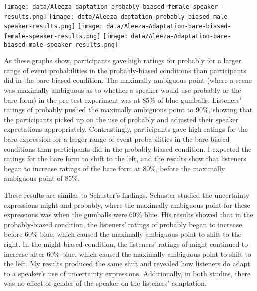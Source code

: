 \documentclass[lucida,biblatex]{sp} %
\begin{document}
\begin{center}
\texttt{[image: data/Aleeza-daptation-probably-biased-female-speaker-results.png]}
\texttt{[image: data/Aleeza-daptation-probably-biased-male-speaker-results.png]}
\texttt{[image: data/Aleeza-Adaptation-bare-biased-female-speaker-results.png]}
\texttt{[image: data/Aleeza-Adaptation-bare-biased-male-speaker-results.png]}
\vspace{2em}
\end{center}
As these graphs show, participants gave high ratings for probably for a larger range of event probabilities in the probably-biased conditions than participants did in the bare-biased condition. The maximally ambiguous point (where a scene was maximally ambiguous as to whether a speaker would use probably or the bare form) in the pre-test experiment was at 85\% of blue gumballs. Listeners’ ratings of probably pushed the maximally ambiguous point to 90\%, showing that the participants picked up on the use of probably and adjusted their speaker expectations appropriately. Contrastingly, participants gave high ratings for the bare expression for a larger range of event probabilities in the bare-biased conditions than participants did in the probably-biased condition. I expected the ratings for the bare form to shift to the left, and the results show that listeners began to increase ratings of the bare form at 80\%, before the maximally ambiguous point of 85\%. 

These results are similar to Schuster’s findings. Schuster studied the uncertainty expressions might and probably, where the maximally ambiguous point for these expressions was when the gumballs were 60\% blue. His results showed that in the probably-biased condition, the listeners’ ratings of probably began to increase before 60\% blue, which caused the maximally ambiguous point to shift to the right. In the might-biased condition, the listeners’ ratings of might continued to increase after 60\% blue, which caused the maximally ambiguous point to shift to the left. My results produced the same shift and revealed how listeners do adapt to a speaker’s use of uncertainty expressions. Additionally, in both studies, there was no effect of gender of the speaker on the listeners’ adaptation. 
\end{document}
